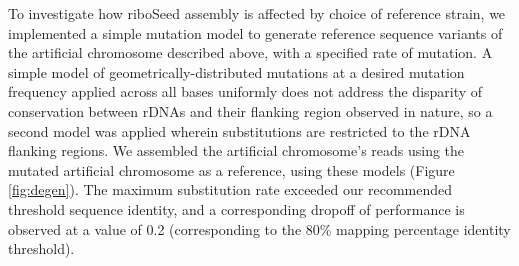 To investigate how riboSeed assembly is affected by choice of reference strain, we implemented a simple mutation model to generate reference sequence variants of the artificial chromosome described above, with a specified rate of mutation. A simple model of geometrically-distributed mutations at a desired mutation frequency applied across all bases uniformly does not address the disparity of conservation between rDNAs and their flanking region observed in nature, so a second model was applied wherein substitutions are restricted to the rDNA flanking regions. We assembled the artificial chromosome's reads using the mutated artificial chromosome as a reference, using these models (Figure \ref{fig:degen}). The maximum substitution rate exceeded our recommended threshold sequence identity, and a corresponding dropoff of performance is observed at a value of 0.2 (corresponding to the 80\% mapping percentage identity threshold).
